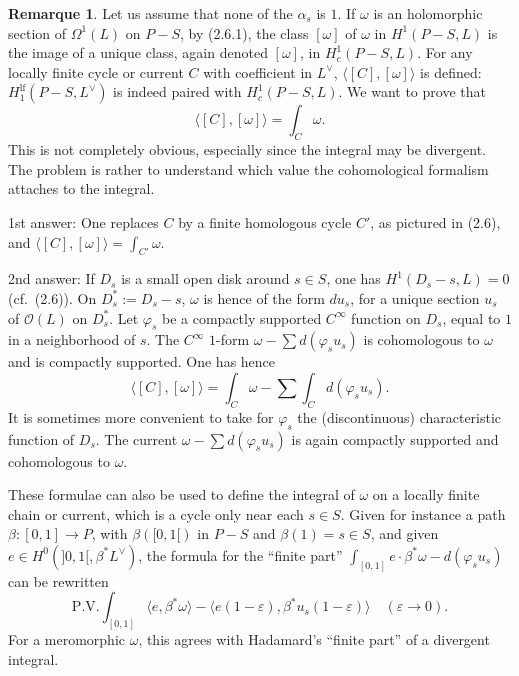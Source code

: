 \documentclass[12pt,a4paper]{article}
\theoremstyle{plain}
\theoremstyle{definition}
\newtheorem{remark}[theorem]{Remarque}
\theoremstyle{remark}
\numberwithin{equation}{section}
\begin{document}
\begin{remark}\label{rmk:2.16}
Let us assume that none of the $\alpha_s$ is $1$. If $\omega$ is an holomorphic section of $\Omega^1(L)$ on $P-S$, by (2.6.1), the class $[\omega]$ of $\omega$ in $H^1(P-S, L)$ is the image of a unique class, again denoted $[\omega]$, in $H^1_c(P-S, L)$. For any locally finite cycle or current $C$ with coefficient in $L^\vee$, $\langle [C], [\omega] \rangle$ is defined: $H^{\mathrm{lf}}_1(P-S, L^\vee)$ is indeed paired with $H^1_c(P-S, L)$. We want to prove that
\[
\langle [C], [\omega] \rangle = \int_C \omega.
\]
This is not completely obvious, especially since the integral may be divergent. The problem is rather to understand which value the cohomological formalism attaches to the integral.

1st answer: One replaces $C$ by a finite homologous cycle $C'$, as pictured in (2.6), and $\langle [C], [\omega] \rangle = \int_{C'} \omega$.

2nd answer: If $D_s$ is a small open disk around $s \in S$, one has $H^1(D_s-s, L) = 0$ (cf.\ (2.6)). On $D_s^* := D_s - s$, $\omega$ is hence of the form $du_s$, for a unique section $u_s$ of $\mathcal{O}(L)$ on $D_s^*$. Let $\varphi_s$ be a compactly supported $C^\infty$ function on $D_s$, equal to $1$ in a neighborhood of $s$. The $C^\infty$ $1$-form $\omega - \sum d(\varphi_s u_s)$ is cohomologous to $\omega$ and is compactly supported. One has hence
\[
\langle [C], [\omega] \rangle = \int_C \omega - \sum \int_C d(\varphi_s u_s).
\]
It is sometimes more convenient to take for $\varphi_s$ the (discontinuous) characteristic function of $D_s$. The current $\omega - \sum d(\varphi_s u_s)$ is again compactly supported and cohomologous to $\omega$.

These formulae can also be used to define the integral of $\omega$ on a locally finite chain or current, which is a cycle only near each $s \in S$. Given for instance a path $\beta: [0,1] \to P$, with $\beta([0,1[)$ in $P-S$ and $\beta(1) = s \in S$, and given $e \in H^0(]0,1[, \beta^*L^\vee)$, the formula for the ``finite part'' $\int_{[0,1]} e \cdot \beta^*\omega - d(\varphi_s u_s)$ can be rewritten
\[
\mathrm{P.V.} \int_{[0,1]} \langle e, \beta^*\omega \rangle - \langle e(1-\varepsilon), \beta^*u_s(1-\varepsilon) \rangle \quad (\varepsilon \to 0).
\]
For a meromorphic $\omega$, this agrees with Hadamard's ``finite part'' of a divergent integral.
\end{remark}
\end{document}
